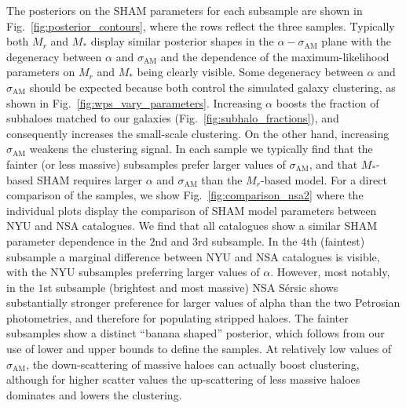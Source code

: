 \documentclass[usenatbib,useAMS]{mnras}
\newcommand{\scatter}{\ensuremath{\sigma_{\mathrm{AM}}}}
\begin{document}
The posteriors on the \ac{SHAM} parameters for each subsample are shown in Fig.~\ref{fig:posterior_contours}, where the rows reflect the three samples. Typically both $M_r$ and $M_*$ display similar posterior shapes in the $\alpha-\scatter$ plane with the degeneracy between $\alpha$ and $\scatter$ and the dependence of the maximum-likelihood parameters on $M_r$ and $M_*$ being clearly visible. Some degeneracy between $\alpha$ and $\scatter$ should be expected because both control the simulated galaxy clustering, as shown in Fig.~\ref{fig:wps_vary_parameters}. Increasing $\alpha$ boosts the fraction of subhaloes matched to our galaxies (Fig.~\ref{fig:subhalo_fractions}), and consequently increases the small-scale clustering. On the other hand, increasing $\scatter$ weakens the clustering signal. In each sample we typically find that the fainter (or less massive) subsamples prefer larger values of $\scatter$, and that $M_*$-based \ac{SHAM} requires larger $\alpha$ and $\scatter$ than the $M_r$-based model. For a direct comparison of the samples, we show Fig.~\ref{fig:comparison_nsa2} where the individual plots display the comparison of \ac{SHAM} model parameters between \ac{NYU} and \ac{NSA} catalogues. We find that all catalogues show a similar \ac{SHAM} parameter dependence in the $2$nd and $3$rd subsample. In the $4$th (faintest) subsample a marginal difference between \ac{NYU} and \ac{NSA} catalogues is visible, with the \ac{NYU} subsamples preferring larger values of $\alpha$. However, most notably, in the $1$st subsample (brightest and most massive) \ac{NSA} S\'ersic shows substantially stronger preference for larger values of alpha than the two Petrosian photometries, and therefore for populating stripped haloes. The fainter subsamples show a distinct ``banana shaped'' posterior, which follows from our use of lower and upper bounds to define the samples. At relatively low values of $\scatter$, the down-scattering of massive haloes can actually boost clustering, although for higher scatter values the up-scattering of less massive haloes dominates and lowers the clustering.
\end{document}
